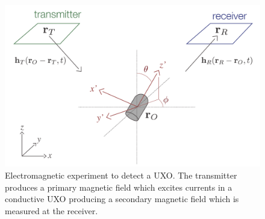 \begin{figure}[htb]
    \begin{center}
    \includegraphics[width=0.85\columnwidth]{figures/uxo-coordinates-01-01.png}
    \end{center}
\caption{
    Electromagnetic experiment to detect a UXO.
    The transmitter produces a primary magnetic field which excites
    currents in a conductive UXO producing a secondary magnetic field
    which is measured at the receiver.
}
\label{fig:uxo-coordinates}
\end{figure}
